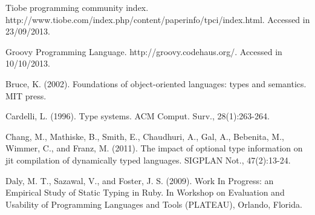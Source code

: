 \documentclass[msc]{ppgccufmg}
\begin{document}





\renewcommand{\bibfont}{\normalsize}
\begin{thebibliography}{}

Tiobe programming community index. http://www.tiobe.com/index.php/content/paperinfo/tpci/index.html. Accessed in 23/09/2013.

Groovy Programming Language. http://groovy.codehaus.org/. Accessed in 10/10/2013.

Bruce, K. (2002). Foundations of object-oriented languages: types and semantics. MIT press.


Cardelli, L. (1996). Type systems. ACM Comput. Surv., 28(1):263-264.

Chang, M., Mathiske, B., Smith, E., Chaudhuri, A., Gal, A., Bebenita, M., Wimmer, C., and Franz, M. (2011). The impact of optional type information on jit compilation of dynamically typed languages. SIGPLAN Not., 47(2):13-24.

Daly, M. T., Sazawal, V., and Foster, J. S. (2009). Work In Progress: an Empirical Study of Static Typing in Ruby. In Workshop on Evaluation and Usability of Programming Languages and Tools (PLATEAU), Orlando, Florida.


\end{thebibliography}
\end{document}
